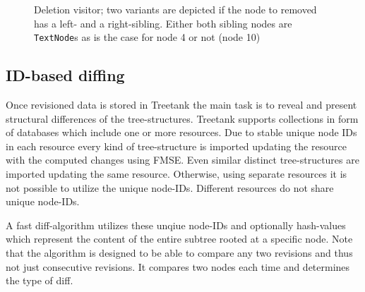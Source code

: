 \begin{figure}[tb]
\caption{\label{fig:deletionvisitor} Deletion visitor; two variants are depicted if the node to removed has a left- and a right-sibling. Either both sibling nodes are \texttt{TextNode}s as is the case for node 4 or not (node 10)}
\end{figure} 

\subsection{ID-based diffing}
Once revisioned data is stored in Treetank the main task is to reveal and present structural differences of the tree-structures. Treetank supports collections in form of databases which include one or more resources. Due to stable unique node IDs in each resource every kind of tree-structure is imported updating the resource with the computed changes using FMSE. Even similar distinct tree-structures are imported updating the same resource. Otherwise, using separate resources it is not possible to utilize the unique node-IDs. Different resources do not share unique node-IDs. 

A fast diff-algorithm utilizes these unqiue node-IDs and optionally hash-values which represent the content of the entire subtree rooted at a specific node. Note that the algorithm is designed to be able to compare any two revisions and thus not just consecutive revisions. It compares two nodes each time and determines the type of diff. 


